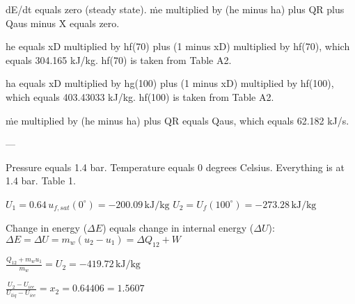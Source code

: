 dE/dt equals zero (steady state).  
ṁe multiplied by (he minus ha) plus QR plus Qaus minus Ẋ equals zero.  

he equals xD multiplied by hf(70) plus (1 minus xD) multiplied by hf(70), which equals 304.165 kJ/kg. hf(70) is taken from Table A2.  

ha equals xD multiplied by hg(100) plus (1 minus xD) multiplied by hf(100), which equals 403.43033 kJ/kg. hf(100) is taken from Table A2.  

ṁe multiplied by (he minus ha) plus QR equals Qaus, which equals 62.182 kJ/s.  

---

Pressure equals 1.4 bar.  
Temperature equals 0 degrees Celsius. Everything is at 1.4 bar. Table 1.  

\( U_1 = 0.64 \, u_{f,sat}(0^\circ) = -200.09 \, \text{kJ/kg} \)  
\( U_2 = U_{f}(100^\circ) = -273.28 \, \text{kJ/kg} \)  

Change in energy (\( \Delta E \)) equals change in internal energy (\( \Delta U \)):  
\( \Delta E = \Delta U = m_w (u_2 - u_1) = \Delta Q_{12} + W \)  

\( \frac{Q_{12} + m_w u_1}{m_w} = U_2 = -419.72 \, \text{kJ/kg} \)  

\( \frac{U_2 - U_{ice}}{U_{liq} - U_{ice}} = x_2 = 0.64406 = 1.5607 \)